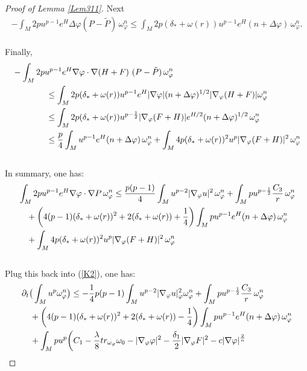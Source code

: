 \documentclass[11pt]{amsart}
\numberwithin{equation}{section}
\begin{document}
\begin{proof}[Proof of Lemma \ref{Lem311}]
Next
\begin{align}
	-\int_M 2p u^{p-1}e^{H} \Delta \varphi (P - \tilde{P}) \, \omega_{\varphi}^n \le  \int_M 2p(\delta_* + \omega(r)) u^{p - 1}e^H (n + \Delta \varphi) \, \omega_{\varphi}^n.
\end{align}\\
Finally,
\begin{align}
	&-\int_M 2p u^{p - 1} e^{H} \nabla \varphi \cdot \nabla (H+F)\ (P - \tilde{P}) \, \omega_{\varphi}^n \notag\\
	&\qquad\qquad \le  \int_M 2p(\delta_* + \omega(r))u^{p-1}e^H |\nabla\varphi|(n+\Delta\varphi)^{1/2}|\nabla_\varphi (H+F)|\omega_\varphi^n      \notag\\       
	&\qquad\qquad \le  \int_M 2p(\delta_* + \omega(r)) u^{p - \frac{1}{2}} |\nabla_{\varphi}(F+H)| e^{H/2} (n + \Delta \varphi)^{1/2} \, \omega_{\varphi}^n \notag \\
	&\qquad\qquad \le  \frac{p}{4} \int_M u^{p - 1}e^H (n + \Delta \varphi) \, \omega_{\varphi}^n + \int_M 4p(\delta_* + \omega(r))^2 u^p |\nabla_{\varphi} (F+H)|^2 \, \omega_{\varphi}^n
\end{align}\\
In summary, one has:
\begin{align}
	&\int_M 2p u^{p - 1}e^H \nabla \varphi \cdot \nabla P \, \omega_{\varphi}^n \le  \frac{p(p - 1)}{4} \int_M u^{p - 2} |\nabla_{\varphi} u|^2 \, \omega_{\varphi}^n + \int_M p u^{p - \frac{1}{2}} \frac{C_{3}}{r} \, \omega_{\varphi}^n \notag \\
	&\quad + \left( 4(p - 1)(\delta_* + \omega(r))^2 + 2(\delta_* + \omega(r))+\frac{1}{4} \right) \int_M p u^{p - 1} e^H (n + \Delta \varphi) \, \omega_{\varphi}^n \notag\\
	&\quad + \int_M 4p(\delta_* + \omega(r))^2 u^p |\nabla_{\varphi} (F+H)|^2 \, \omega_{\varphi}^n
\end{align} \\
Plug this back into (\ref{K2}), one has:
\begin{align}
	&\partial_t\big( \int_M u^p\omega_\varphi^n\big)\le  -\frac{1}{4} p(p-1)\int_M  u^{p-2} |\nabla_\varphi u|^2_\varphi\omega_\varphi^n + \int_M p u^{p - \frac{1}{2}} \frac{C_{3}}{r} \, \omega_{\varphi}^n  \notag\\
	&\quad + \left( 4(p - 1)(\delta_* + \omega(r))^2 + 2(\delta_* + \omega(r))-\frac{1}{4} \right) \int_M p u^{p - 1} e^H (n + \Delta \varphi) \, \omega_{\varphi}^n \notag\\
	&\quad +\int_M pu^{p} \bigg(C_1 -\frac{\lambda}{8}tr_{\omega_{\varphi}}\omega_0 -|\nabla_\varphi\varphi|^2  -\frac{\delta_1}{2} |\nabla_\varphi F|^2 - c|\nabla\varphi|^{\frac{2}{n}}  \notag\\

\end{align}
\end{proof}
\end{document}
